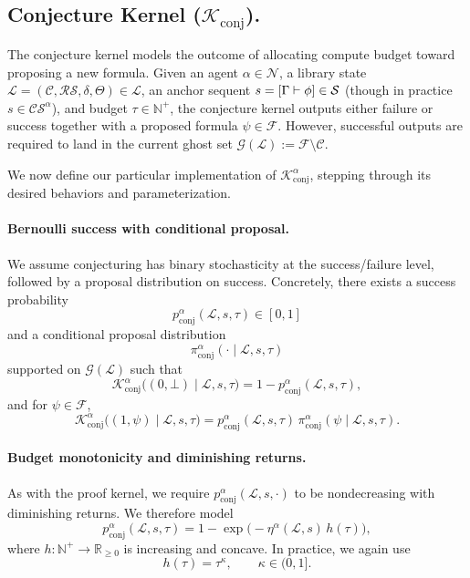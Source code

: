 \subsection{Conjecture Kernel ($\mathcal{K}_{\text{conj}}$).}
The conjecture kernel models the outcome of allocating compute budget toward proposing a new formula. Given an agent $\alpha\in\mathcal N$, a library state $\mathcal L=(\mathcal C,\mathcal{RS},\delta,\Theta)\in\mathscr L$, an anchor sequent $s=[\Gamma\vdash\phi]\in\mathcal S$ (though in practice $s\in\mathcal{CS}^\alpha$), and budget $\tau\in\mathbb N^+$, the conjecture kernel outputs either failure or success together with a proposed formula $\psi\in\mathcal F$. However, successful outputs are required to land in the current ghost set $\mathcal G(\mathcal{L}) :=\mathcal F\setminus \mathcal C$.

We now define our particular implementation of $\mathcal K^\alpha_{\mathrm{conj}}$, stepping through its desired behaviors and parameterization.

\paragraph{Bernoulli success with conditional proposal.}
We assume conjecturing has binary stochasticity at the success/failure level, followed by a proposal distribution on success. Concretely, there exists a success probability
\[
p^\alpha_{\mathrm{conj}}(\mathcal L,s,\tau)\in[0,1]
\]
and a conditional proposal distribution
\[
\pi^\alpha_{\mathrm{conj}}(\cdot\mid \mathcal L,s,\tau)
\]
supported on $\mathcal G(\mathcal L)$ such that
\[
\mathcal K^\alpha_{\mathrm{conj}}\big((0,\bot)\mid \mathcal L,s,\tau\big)
=
1-p^\alpha_{\mathrm{conj}}(\mathcal L,s,\tau),
\]
and for $\psi\in\mathcal F$,
\[
\mathcal K^\alpha_{\mathrm{conj}}\big((1,\psi)\mid \mathcal L,s,\tau\big)
=
p^\alpha_{\mathrm{conj}}(\mathcal L,s,\tau)\,\pi^\alpha_{\mathrm{conj}}(\psi\mid \mathcal L,s,\tau).
\]

\paragraph{Budget monotonicity and diminishing returns.}
As with the proof kernel, we require $p^\alpha_{\mathrm{conj}}(\mathcal L,s,\cdot)$ to be nondecreasing with diminishing returns. We therefore model
\[
p^\alpha_{\mathrm{conj}}(\mathcal L,s,\tau)
=
1-\exp\!\big(-\eta^\alpha(\mathcal L,s)\,h(\tau)\big),
\]
where $h:\mathbb N^+\to\mathbb R_{\ge 0}$ is increasing and concave. In practice, we again use
\[
h(\tau)=\tau^\kappa,\qquad \kappa\in(0,1].
\]

